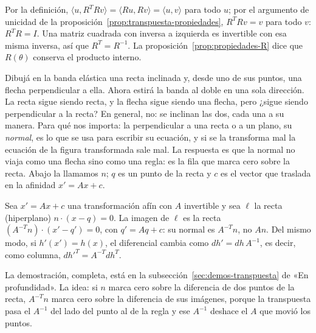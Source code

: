 \begin{demostracion}
Por la definición, \(\langle u,R^TRv\rangle=\langle Ru,Rv\rangle=\langle u,v\rangle\) para
todo \(u\); por el argumento de unicidad de la proposición~\ref{prop:transpuesta-propiedades},
\(R^TRv=v\) para todo \(v\): \(R^TR=I\). Una matriz cuadrada con inversa a izquierda
es invertible con esa misma inversa, así que \(R^T=R^{-1}\). La
proposición~\ref{prop:propiedades-R} dice que \(R(\theta)\) conserva el producto interno.
\end{demostracion}



Dibujá en la banda elástica una recta inclinada y, desde uno de sus puntos, una flecha
perpendicular a ella. Ahora estirá la banda al doble en una sola dirección. La recta sigue
siendo recta, y la flecha sigue siendo una flecha, pero ¿sigue siendo perpendicular a la
recta? En general, no: se inclinan las dos, cada una a su manera. Para qué nos importa: la
perpendicular a una recta o a un plano, su \emph{normal}, es lo que se usa para escribir su
ecuación, y si se la transforma mal la ecuación de la figura transformada sale mal. La
respuesta es que la normal no viaja como una flecha sino como una regla: es la fila que marca
cero sobre la recta. Abajo la llamamos \(n\); \(q\) es un punto de la recta y \(c\) es el
vector que traslada en la afinidad \(x'=Ax+c\).

\begin{proposicion}\label{prop:normales-inversa-transpuesta}
Sea \(x'=Ax+c\) una transformación afín con \(A\) invertible y sea \(\ell\) la recta
(hiperplano) \(n\cdot(x-q)=0\). La imagen de \(\ell\) es la recta
\((A^{-T}n)\cdot(x'-q')=0\), con \(q'=Aq+c\): su normal es \(A^{-T}n\), no \(An\). Del mismo
modo, si \(h'(x')=h(x)\), el diferencial cambia como \(dh'=dh\,A^{-1}\), es decir, como
columna, \(dh'^T=A^{-T}dh^T\).
\end{proposicion}

La demostración, completa, está en la subsección~\ref{sec:demos-transpuesta} de «En profundidad». La idea: si \(n\)
marca cero sobre la diferencia de dos puntos de la recta, \(A^{-T}n\) marca cero sobre la
diferencia de sus imágenes, porque la transpuesta pasa el \(A^{-1}\) del lado del punto al
de la regla y ese \(A^{-1}\) deshace el \(A\) que movió los puntos.

